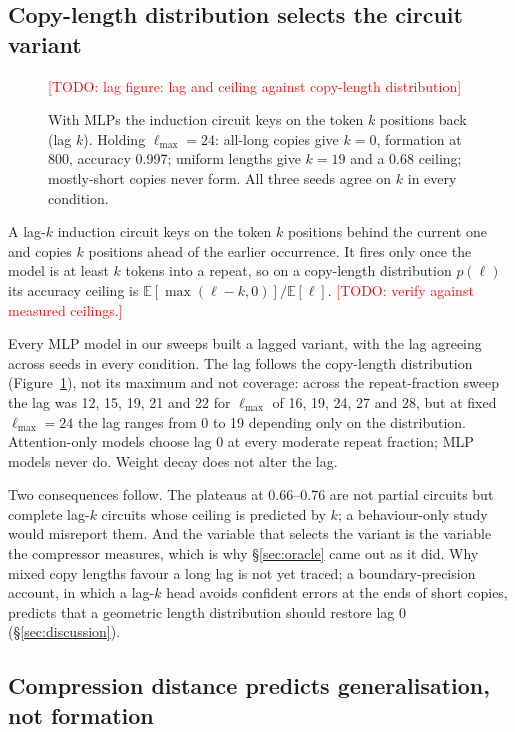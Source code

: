 \documentclass[11pt]{article}
\newcommand{\todo}[1]{\textcolor{red}{[TODO: #1]}}
\begin{document}
\subsection{Copy-length distribution selects the circuit variant}
\label{sec:lag}

\begin{figure}[t]\centering
\todo{lag figure: lag and ceiling against copy-length distribution}
\caption{With MLPs the induction circuit keys on the token $k$ positions
back (lag $k$). Holding $\ell_{\max}=24$: all-long copies give $k=0$,
formation at 800, accuracy 0.997; uniform lengths give $k=19$ and a 0.68
ceiling; mostly-short copies never form. All three seeds agree on $k$ in
every condition.}
\label{fig:lag}
\end{figure}

A lag-$k$ induction circuit keys on the token $k$ positions behind the
current one and copies $k$ positions ahead of the earlier occurrence. It
fires only once the model is at least $k$ tokens into a repeat, so on a
copy-length distribution $p(\ell)$ its accuracy ceiling is
$\mathbb{E}[\max(\ell-k,0)]/\mathbb{E}[\ell]$. \todo{verify against
measured ceilings.}

Every MLP model in our sweeps built a lagged variant, with the lag agreeing
across seeds in every condition. The lag follows the copy-length
distribution (Figure~\ref{fig:lag}), not its maximum and not coverage:
across the repeat-fraction sweep the lag was 12, 15, 19, 21 and 22 for
$\ell_{\max}$ of 16, 19, 24, 27 and 28, but at fixed $\ell_{\max}=24$ the
lag ranges from 0 to 19 depending only on the distribution. Attention-only
models choose lag 0 at every moderate repeat fraction; MLP models never
do. Weight decay does not alter the lag.

Two consequences follow. The plateaus at 0.66--0.76 are not partial
circuits but complete lag-$k$ circuits whose ceiling is predicted by $k$; a
behaviour-only study would misreport them. And the variable that selects
the variant is the variable the compressor measures, which is why
\S\ref{sec:oracle} came out as it did. Why mixed copy lengths favour a
long lag is not yet traced; a boundary-precision account, in which a
lag-$k$ head avoids confident errors at the ends of short copies, predicts
that a geometric length distribution should restore lag 0
(\S\ref{sec:discussion}).

\subsection{Compression distance predicts generalisation, not formation}
\label{sec:diversity}
\end{document}
